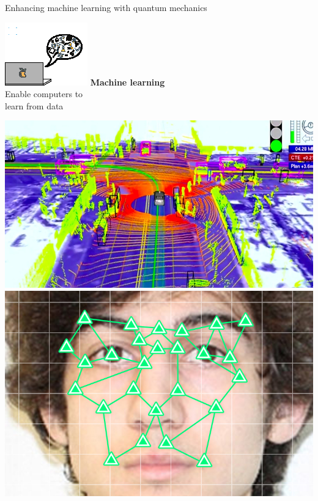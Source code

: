 \documentclass[10pt]{beamer}
\begin{document}
{
\begin{frame}[fragile]{Enhancing machine learning with quantum mechanics}

\begin{minipage}[c]{0.45\textwidth}
\includegraphics[scale=3.5]{Vectors/laptop_ml.eps}
\newline
\textbf{Machine learning}\\
Enable computers to\\
learn from data
\end{minipage}%
\hspace{0.5cm}
\begin{minipage}[c]{0.49\textwidth}
\flushright
\includegraphics[scale=0.09]{google_car.jpeg}
\includegraphics[scale=0.55]{facial_recognition.jpg}\\

\end{minipage}
\end{frame}}
\end{document}

